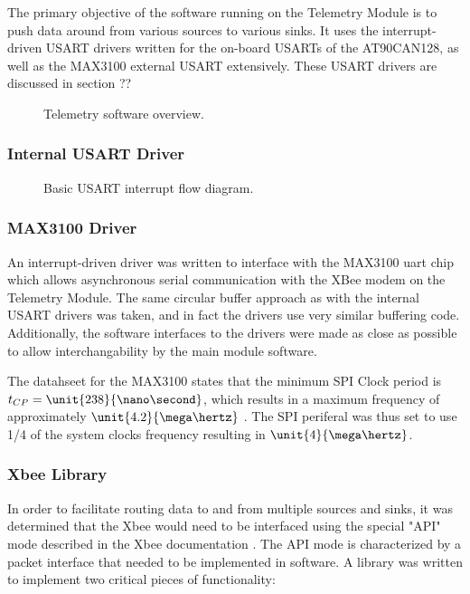 The primary objective of the software running on the Telemetry Module is to push data around from various sources to various sinks. It uses the interrupt-driven USART drivers written for the on-board USARTs of the AT90CAN128, as well as the MAX3100 external USART extensively. These USART drivers are discussed in section ?? 

\begin{figure}[H]
\centering

\caption{Telemetry software overview.}
\label{fig:telemetry_software_implementation}
\end{figure}

\subsubsection{Internal USART Driver}

\begin{figure}[]
\centering

\caption{Basic USART interrupt flow diagram.}
\label{fig:usart_driver_flow}
\end{figure}


\subsubsection{MAX3100 Driver}

An interrupt-driven driver was written to interface with the MAX3100 uart chip which allows asynchronous serial communication with the XBee modem on the Telemetry Module. The same circular buffer approach as with the internal USART drivers was taken, and in fact the drivers use very similar buffering code. Additionally, the software interfaces to the drivers were made as close as possible to allow interchangability by the main module software.

The datahseet for the MAX3100 states that the minimum SPI Clock period is $t_{CP}=\unit{238}{\nano\second}$, which results in a maximum frequency of approximately $\unit{4.2}{\mega\hertz}$ \cite{MAX3100}. The SPI periferal was thus set to use 1/4 of the system clocks frequency resulting in $\unit{4}{\mega\hertz}$.



\subsubsection{Xbee Library}

In order to facilitate routing data to and from multiple sources and sinks, it was determined that the Xbee would need to be interfaced using the special "API" mode described in the Xbee documentation \cite{XBeeManual}. The API mode is characterized by a packet interface that needed to be implemented in software. A library was written to implement two critical pieces of functionality:

